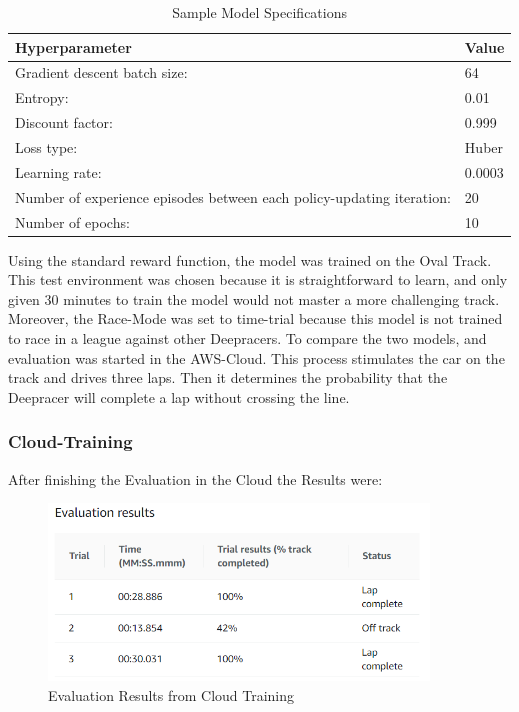 \begin{table} [H]
\caption{Sample Model Specifications}
\label{Sample Model Specifications}
\centering
\begin{tabular}{|m{15em}|m{1cm}|}
\hline
\textbf{Hyperparameter} & \textbf{Value} \\
\hline
Gradient descent batch size: & 64 \\
\hline
Entropy: & 0.01 \\
\hline
Discount factor: & 0.999 \\
\hline
Loss type: & Huber \\
\hline
Learning rate: & 0.0003 \\
\hline
Number of experience episodes between each policy-updating iteration: & 20 \\
\hline
Number of epochs: & 10 \\
\hline
\end{tabular}
\end{table}

Using the standard reward function, the model was trained on the Oval Track. This test environment was chosen because it is straightforward to learn, and only given 30 minutes to train the model would not master a more challenging track. Moreover, the Race-Mode was set to time-trial because this model is not trained to race in a league against other Deepracers.
\newline
To compare the two models, and evaluation was started in the AWS-Cloud. This process stimulates the car on the track and drives three laps. Then it determines the probability that the Deepracer will complete a lap without crossing the line.


\subsubsection{Cloud-Training}
After finishing the Evaluation in the Cloud the Results were:

\begin{figure}[H]
    \centering
    \includegraphics[width=0.9\textwidth]{images/CloudEvaluationResults.PNG}
    \caption[]{Evaluation Results from Cloud Training}
    \label{fig:evRe}
\end{figure}



